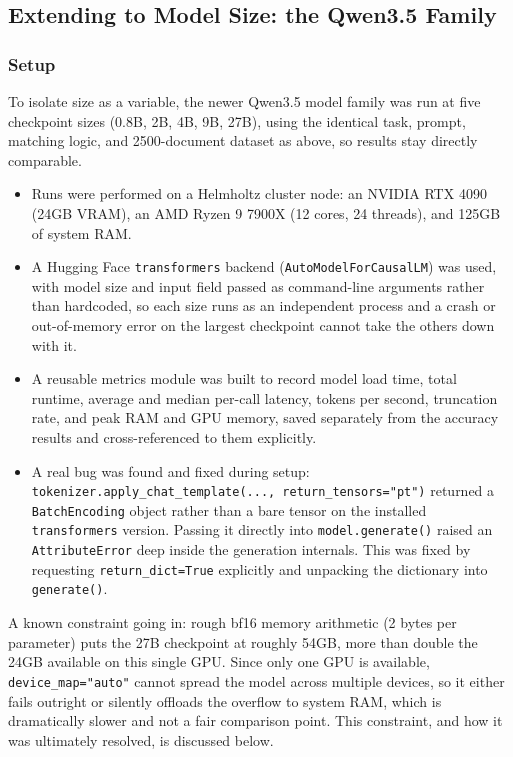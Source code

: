 \subsection{Extending to Model Size: the Qwen3.5 Family}
\label{sec:model-size-setup}

\subsubsection{Setup}

To isolate size as a variable, the newer Qwen3.5 model family was run at five checkpoint sizes (0.8B, 2B, 4B, 9B, 27B), using the identical task, prompt, matching logic, and 2500-document dataset as above, so results stay directly comparable.

\begin{itemize}
    \item Runs were performed on a Helmholtz cluster node: an NVIDIA RTX 4090 (24GB VRAM), an AMD Ryzen 9 7900X (12 cores, 24 threads), and 125GB of system RAM.
    \item A Hugging Face \texttt{transformers} backend (\texttt{AutoModelForCausalLM}) was used, with model size and input field passed as command-line arguments rather than hardcoded, so each size runs as an independent process and a crash or out-of-memory error on the largest checkpoint cannot take the others down with it.
    \item A reusable metrics module was built to record model load time, total runtime, average and median per-call latency, tokens per second, truncation rate, and peak RAM and GPU memory, saved separately from the accuracy results and cross-referenced to them explicitly.
    \item A real bug was found and fixed during setup: \texttt{tokenizer.apply\_chat\_template(..., return\_tensors="pt")} returned a \texttt{BatchEncoding} object rather than a bare tensor on the installed \texttt{transformers} version. Passing it directly into \texttt{model.generate()} raised an \texttt{AttributeError} deep inside the generation internals. This was fixed by requesting \texttt{return\_dict=True} explicitly and unpacking the dictionary into \texttt{generate()}.
\end{itemize}

A known constraint going in: rough bf16 memory arithmetic (2 bytes per parameter) puts the 27B checkpoint at roughly 54GB, more than double the 24GB available on this single GPU. Since only one GPU is available, \texttt{device\_map="auto"} cannot spread the model across multiple devices, so it either fails outright or silently offloads the overflow to system RAM, which is dramatically slower and not a fair comparison point. This constraint, and how it was ultimately resolved, is discussed below.

